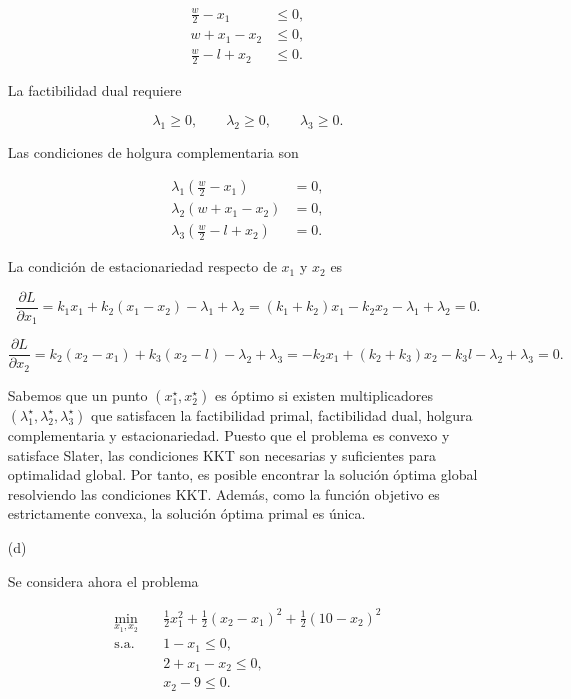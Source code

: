 \begin{enumerate}
\begin{align}
\frac{w}{2}-x_1
&\leq 0,\\
w+x_1-x_2
&\leq 0,\\
\frac{w}{2}-l+x_2
&\leq 0.
\end{align}


La factibilidad dual requiere

\begin{equation}
\lambda_1\geq 0,\qquad
\lambda_2\geq 0,\qquad
\lambda_3\geq 0.
\end{equation}

Las condiciones de holgura complementaria son

\begin{align}
\lambda_1
\left(
\frac{w}{2}-x_1
\right)
&=0,\\
\lambda_2
\left(
w+x_1-x_2
\right)
&=0,\\
\lambda_3
\left(
\frac{w}{2}-l+x_2
\right)
&=0.
\end{align}

La condición de estacionariedad respecto de \(x_1\) y $x_2$ es

\begin{equation}
\frac{\partial L}{\partial x_1}=
k_1x_1+k_2(x_1-x_2)-\lambda_1+\lambda_2=
(k_1+k_2)x_1-k_2x_2-\lambda_1+\lambda_2=0.
\end{equation}

\begin{equation}
\frac{\partial L}{\partial x_2}=
k_2(x_2-x_1)+k_3(x_2-l)-\lambda_2+\lambda_3=
-k_2x_1+(k_2+k_3)x_2-k_3l-\lambda_2+\lambda_3=0.
\end{equation}

Sabemos que un punto \((x_1^\star,x_2^\star)\) es óptimo si existen multiplicadores \((\lambda_1^\star,\lambda_2^\star,\lambda_3^\star)\) que satisfacen la factibilidad primal, factibilidad dual, holgura complementaria y estacionariedad. Puesto que el problema es convexo y satisface Slater, las condiciones KKT son necesarias y suficientes para optimalidad global. Por tanto, es posible encontrar la solución óptima global resolviendo las condiciones KKT. Además, como la función objetivo es estrictamente convexa, la solución óptima primal es única.


  \item[(d)]

Se considera ahora el problema

\begin{align}
\min_{x_1,x_2}\quad
&
\frac{1}{2}x_1^2
+
\frac{1}{2}(x_2-x_1)^2
+
\frac{1}{2}(10-x_2)^2\\
\text{s.a.}\quad
&
1-x_1\leq 0,\\
&
2+x_1-x_2\leq 0,\\
&
x_2-9\leq 0.
\label{ex:6:6:eq:tercera_d}
\end{align}


\end{enumerate}
